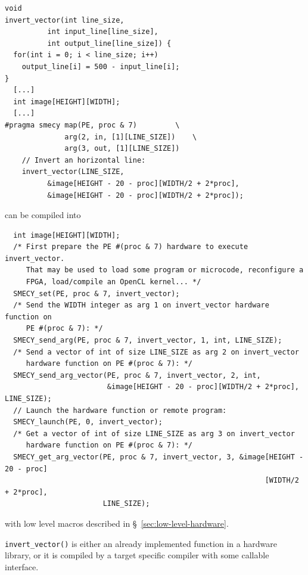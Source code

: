 \documentclass[a4paper]{article}
\begin{document}
\begin{lstlisting}
void
invert_vector(int line_size,
          int input_line[line_size],
          int output_line[line_size]) {
  for(int i = 0; i < line_size; i++)
    output_line[i] = 500 - input_line[i];
}
  [...]
  int image[HEIGHT][WIDTH];
  [...]
#pragma smecy map(PE, proc & 7)         \
              arg(2, in, [1][LINE_SIZE])    \
              arg(3, out, [1][LINE_SIZE])
    // Invert an horizontal line:
    invert_vector(LINE_SIZE,
          &image[HEIGHT - 20 - proc][WIDTH/2 + 2*proc],
          &image[HEIGHT - 20 - proc][WIDTH/2 + 2*proc]);
\end{lstlisting}
can be compiled into
\begin{lstlisting}
  int image[HEIGHT][WIDTH];
  /* First prepare the PE #(proc & 7) hardware to execute invert_vector.
     That may be used to load some program or microcode, reconfigure a
     FPGA, load/compile an OpenCL kernel... */
  SMECY_set(PE, proc & 7, invert_vector);
  /* Send the WIDTH integer as arg 1 on invert_vector hardware function on
     PE #(proc & 7): */
  SMECY_send_arg(PE, proc & 7, invert_vector, 1, int, LINE_SIZE);
  /* Send a vector of int of size LINE_SIZE as arg 2 on invert_vector
     hardware function on PE #(proc & 7): */
  SMECY_send_arg_vector(PE, proc & 7, invert_vector, 2, int,
                        &image[HEIGHT - 20 - proc][WIDTH/2 + 2*proc], LINE_SIZE);
  // Launch the hardware function or remote program:
  SMECY_launch(PE, 0, invert_vector);
  /* Get a vector of int of size LINE_SIZE as arg 3 on invert_vector
     hardware function on PE #(proc & 7): */
  SMECY_get_arg_vector(PE, proc & 7, invert_vector, 3, &image[HEIGHT - 20 - proc]
                                                             [WIDTH/2 + 2*proc],
                       LINE_SIZE);
\end{lstlisting}
with low level macros described in \S~\ref{sec:low-level-hardware}.

\lstinline|invert_vector()| is either an already implemented function in a
hardware library, or it is compiled by a target specific compiler with
some callable interface.
\end{document}
